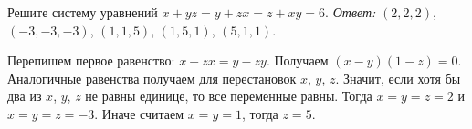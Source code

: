 \problem
Решите систему уравнений $x + y z = y + z x = z + x y = 6$.
\solution
\emph{Ответ:} $(2,2,2)$, $(-3,-3,-3)$, $(1,1,5)$, $(1,5,1)$, $(5,1,1)$.
\par
Перепишем первое равенство: $x - z x = y - z y$.
Получаем $(x - y)(1 - z) = 0$.
Аналогичные равенства получаем для перестановок $x$, $y$, $z$.
Значит, если хотя бы два из $x$, $y$, $z$ не равны единице, то все переменные
равны.
Тогда $x = y = z = 2$ и $x = y = z = -3$.
Иначе считаем $x = y = 1$, тогда $z = 5$.
\endproblem
